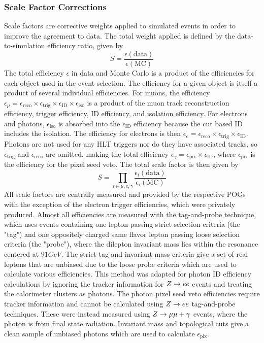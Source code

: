 \subsubsection{Scale Factor Corrections} \label{sec:ana_sf}
Scale factors are corrective weights applied to simulated events in order to improve the agreement to data. The total weight applied is defined by the data-to-simulation efficiency ratio, given by
\begin{equation}
	S=\frac{\epsilon(\text{data})}{\epsilon(\text{MC})}
\end{equation}
The total efficiency $\epsilon$ in data and Monte Carlo is a product of the efficiencies for each object used in the event selection. The efficiency for a given object is itself a product of several individual efficiencies. For muons, the efficiency $\epsilon_\mu=\epsilon_\text{reco}\times\epsilon_\text{trig}\times\epsilon_\text{ID}\times\epsilon_\text{iso}$ is a product of the muon track reconstruction efficiency, trigger efficiency, ID efficiency, and isolation efficiency. For electrons and photons, $\epsilon_\text{iso}$ is absorbed into the $\epsilon_\text{ID}$ efficiency because the cut based ID includes the isolation. The efficiency for electrons is then $\epsilon_e=\epsilon_\text{reco}\times\epsilon_\text{trig}\times\epsilon_\text{ID}$. Photons are not used for any HLT triggers nor do they have associated tracks, so $\epsilon_\text{trig}$ and $\epsilon_\text{reco}$ are omitted, making the total efficiency $\epsilon_\gamma=\epsilon_\text{pix}\times\epsilon_\text{ID}$, where $\epsilon_\text{pix}$ is the efficiency for the pixel seed veto. The total scale factor is then given by
\begin{equation}
	S=\prod_{i\in\mu,e,\gamma}\frac{\epsilon_i(\text{data})}{\epsilon_i(\text{MC})}
\end{equation}
All scale factors are centrally measured and provided by the respective POGs with the exception of the electron trigger efficiencies, which were privately produced. Almost all efficiencies are measured with the tag-and-probe technique, which uses events containing one lepton passing strict selection criteria (the "tag") and one oppositely charged same flavor lepton passing loose selection criteria (the "probe"), where the dilepton invariant mass lies within the \VZ resonance centered at $91\unit{GeV}$. The strict tag and invariant mass criteria give a set of real leptons that are unbiased due to the loose probe criteria which are used to calculate various efficiencies. This method was adapted for photon ID efficiency calculations by ignoring the tracker information for $Z\to ee$ events and treating the calorimeter clusters as photons. The photon pixel seed veto efficiencies require tracker information and cannot be calculated using $Z\to ee$ tag-and-probe techniques. These were instead measured using $Z\to\mu\mu+\gamma$ events, where the photon is from final state radiation. Invariant mass and topological cuts give a clean sample of unbiased photons which are used to calculate $\epsilon_\text{pix}$.

